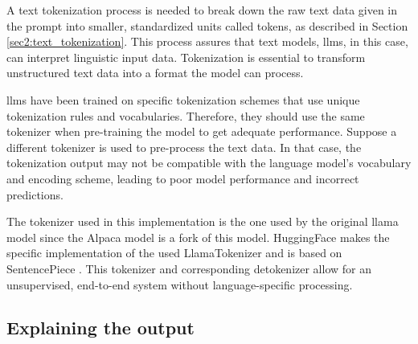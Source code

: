         A text tokenization process is needed to break down the raw text data given in the prompt into smaller, standardized units called tokens, as described in Section \ref{sec2:text_tokenization}. 
        This process assures that text models, \glspl{llm}, in this case, can interpret linguistic input data. Tokenization is essential to transform unstructured text data into a format the model can process.
        
        \glspl{llm} have been trained on specific tokenization schemes that use unique tokenization rules and vocabularies. Therefore, they should use the same tokenizer when pre-training the model to get adequate performance. Suppose a different tokenizer is used to pre-process the text data. In that case, the tokenization output may not be compatible with the language model's vocabulary and encoding scheme, leading to poor model performance and incorrect predictions.
        
    

        The tokenizer used in this implementation is the one used by the original \gls{llama} model \cite{touvronLLaMAOpenEfficient2023} since the Alpaca model is a fork of this model. HuggingFace \cite{HuggingFaceAI} makes the specific implementation of the used LlamaTokenizer  and is based on SentencePiece \cite{LLaMATokenizer, Sentencepiece}. 
        This tokenizer and corresponding detokenizer allow for an unsupervised, end-to-end system without language-specific processing. 



        \subsection{Explaining the output}


